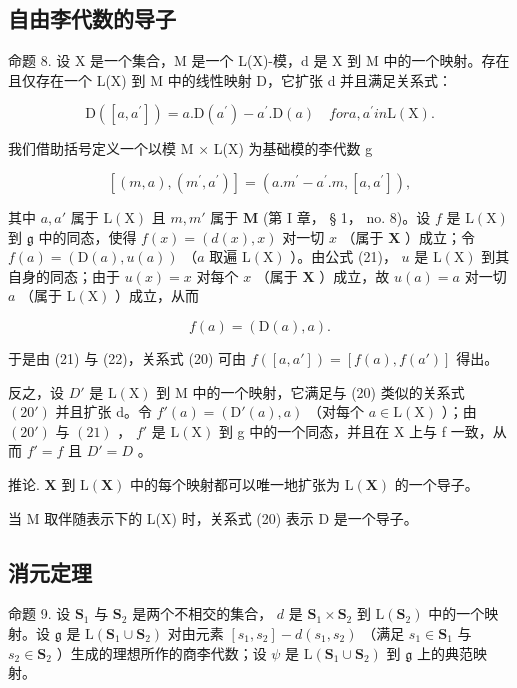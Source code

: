 \subsection{自由李代数的导子}

命题 8. 设 X 是一个集合，M 是一个 L(X)-模，d 是 X 到 M 中的一个映射。存在且仅存在一个 L(X) 到 M 中的线性映射 D，它扩张 d 并且满足关系式：

\[
\mathrm{D} ([ a, a ^ {\prime} ]) = a. \mathrm{D} (a ^ {\prime}) - a ^ {\prime}. \mathrm{D} (a) \quad for a, a ^ {\prime} in \mathrm{L} (\mathrm{X}).\tag{20}
\]

我们借助括号定义一个以模 M × L(X) 为基础模的李代数 g

\[
[ (m, a), (m ^ {\prime}, a ^ {\prime}) ] = (a. m ^ {\prime} - a ^ {\prime}. m, [ a, a ^ {\prime} ]),\tag{21}
\]

其中 \(a, a'\) 属于 \(\mathrm{L}(\mathrm{X})\) 且 \(m, m'\) 属于 \(\mathbf{M}\) (第 I 章， § 1， no. 8)。设 \(f\) 是 \(\mathrm{L}(\mathrm{X})\) 到 \(\mathfrak{g}\) 中的同态，使得 \(f(x) = (d(x), x)\) 对一切 \(x\) （属于 \(\mathbf{X}\) ）成立；令 \(f(a) = (\mathrm{D}(a), u(a))\) （\(a\) 取遍 \(\mathrm{L}(\mathrm{X})\) ）。由公式 (21)， \(u\) 是 \(\mathrm{L}(\mathrm{X})\) 到其自身的同态；由于 \(u(x) = x\) 对每个 \(x\) （属于 \(\mathbf{X}\) ）成立，故 \(u(a) = a\) 对一切 \(a\) （属于 \(\mathrm{L}(\mathrm{X})\) ）成立，从而

\[
f (a) = (\mathrm{D} (a), a).\tag{22}
\]

于是由 (21) 与 (22)，关系式 (20) 可由 \(f([a, a']) = [f(a), f(a')]\) 得出。

反之，设 \(D'\) 是 \(\mathrm{L}(\mathrm{X})\) 到 M 中的一个映射，它满足与 (20) 类似的关系式 \((20')\) 并且扩张 d。令 \(f'(a) = (\mathrm{D}'(a), a)\) （对每个 \(a \in \mathrm{L}(\mathrm{X})\) ）；由 \((20')\) 与 \((21)\) ， \(f'\) 是 \(\mathrm{L}(\mathrm{X})\) 到 g 中的一个同态，并且在 X 上与 f 一致，从而 \(f' = f\) 且 \(D' = D\) 。

推论. \(\mathbf{X}\) 到 \(\mathrm{L}(\mathbf{X})\) 中的每个映射都可以唯一地扩张为 \(\mathrm{L}(\mathbf{X})\) 的一个导子。

当 M 取伴随表示下的 L(X) 时，关系式 (20) 表示 D 是一个导子。

\subsection{消元定理}

命题 9. 设 \(\mathbf{S}_1\) 与 \(\mathbf{S}_2\) 是两个不相交的集合， \(d\) 是 \(\mathbf{S}_1 \times \mathbf{S}_2\) 到 \(\mathrm{L}(\mathbf{S}_2)\) 中的一个映射。设 \(\mathfrak{g}\) 是 \(\mathrm{L}(\mathbf{S}_1 \cup \mathbf{S}_2)\) 对由元素 \([s_1, s_2] - d(s_1, s_2)\) （满足 \(s_1 \in \mathbf{S}_1\) 与 \(s_2 \in \mathbf{S}_2\) ）生成的理想所作的商李代数；设 \(\psi\) 是 \(\mathrm{L}(\mathbf{S}_1 \cup \mathbf{S}_2)\) 到 \(\mathfrak{g}\) 上的典范映射。

